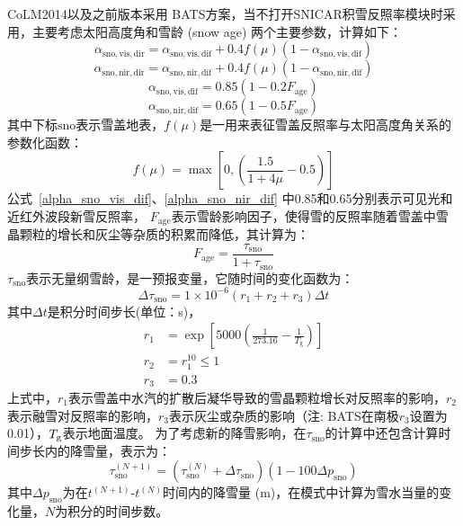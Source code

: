 CoLM2014以及之前版本采用 \citet{dickinson1986biosphere} BATS方案，当不打开SNICAR积雪反照率模块时采用，主要考虑太阳高度角和雪龄 (snow age) 两个主要参数，计算如下：
\begin{equation}
  \alpha_{\mathrm{sno, vis, dir}}=\alpha_{\mathrm{sno, vis, dif}}+0.4 f(\mu)\left(1-\alpha_{\mathrm{sno, vis, dif}}\right)
\end{equation}
%
\begin{equation}
  \alpha_{\mathrm{sno,nir,dir}}=\alpha_{\mathrm{sno, nir, dif}}+0.4 f(\mu)\left(1-\alpha_{\mathrm{sno,nir,dif}}\right)
\end{equation}
%
\begin{equation}\label{alpha_sno_vis_dif}
  \alpha_{\mathrm{sno,vis,dif}}=0.85\left(1-0.2 F_{\mathrm{age}}\right)
\end{equation}
%
\begin{equation}\label{alpha_sno_nir_dif}
  \alpha_{\mathrm{sno,nir,dif}}=0.65\left(1-0.5 F_{\mathrm{age}}\right)
\end{equation}
其中下标${\mathrm {sno}}$表示雪盖地表，$f(\mu)$是一用来表征雪盖反照率与太阳高度角关系的参数化函数：
\begin{equation}\label{fmu}
  f(\mu)=\max\left[0,\left(\frac{1.5}{1+4 \mu}-0.5\right)\right]
\end{equation}
公式~\eqref{alpha_sno_vis_dif}、\eqref{alpha_sno_nir_dif} 中0.85和0.65分别表示可见光和近红外波段新雪反照率，
$F_{\mathrm{age}}$表示雪龄影响因子，使得雪的反照率随着雪盖中雪晶颗粒的增长和灰尘等杂质的积累而降低，其计算为：
\begin{equation}
  F_{\mathrm{a g e}}=\frac{\tau_{\mathrm{sno}}}{1+\tau_{\mathrm{sno}}}
\end{equation}
$\tau_{\mathrm{sno}}$表示无量纲雪龄，是一预报变量，它随时间的变化函数为：
\begin{equation}
  \Delta \tau_{\mathrm{sno}}=1 \times 10^{-6}\left(r_{1}+r_{2}+r_{3}\right) \Delta t
\end{equation}
其中$\Delta t$是积分时间步长(单位：s)，
\begin{align}
  r_{1} &= \exp \left[5000\left(\frac{1}{273.16}-\frac{1}{T_{\mathrm{g}}}\right)\right] \\
  r_{2} &= r_{1}^{10} \leqslant 1 \\
  r_{3} &= 0.3
\end{align}
上式中，$r_1$表示雪盖中水汽的扩散后凝华导致的雪晶颗粒增长对反照率的影响，$r_2$表示融雪对反照率的影响，$r_3$表示灰尘或杂质的影响（注: BATS在南极$r_3$设置为0.01），$T_{\rm g}$表示地面温度。
为了考虑新的降雪影响，在$\tau_{\mathrm{sno}}$的计算中还包含计算时间步长内的降雪量，表示为：
\begin{equation}
  \tau_{\mathrm{sno}}^{(N+1)}=\left(\tau_{\mathrm{sno}}^{(N)}+\Delta \tau_{\mathrm{sno}}\right)\left(1-100 \Delta p_{\mathrm{sno}}\right)
\end{equation}
其中$\Delta p_{\mathrm{sno}}$为在$t^{(N+1)}$-$t^{(N)}$时间内的降雪量 (m)，在模式中计算为雪水当量的变化量，$N$为积分的时间步数。


